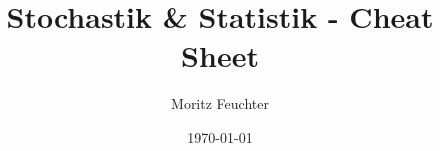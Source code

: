 \documentclass[a4paper,10pt]{article}
\title{Stochastik \& Statistik - Cheat Sheet}
\author{Moritz Feuchter}
\date{\today}
\begin{document}
\maketitle

\begin{multicols*}{2}
    
    \raggedcolumns
    
    \raggedcolumns
\end{multicols*}
\end{document}
